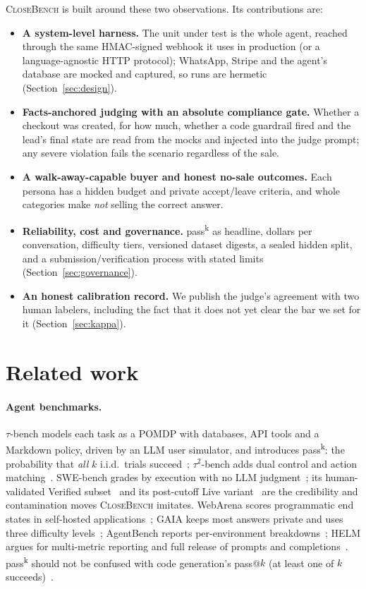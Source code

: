 \documentclass[11pt]{article}
\newcommand{\cb}{\textsc{CloseBench}}
\newcommand{\passk}[1]{pass\textsuperscript{#1}}
\begin{document}
\cb{} is built around these two observations. Its contributions are:
\begin{itemize}
  \item \textbf{A system-level harness.} The unit under test is the whole agent, reached through the
    same HMAC-signed webhook it uses in production (or a language-agnostic HTTP protocol); WhatsApp,
    Stripe and the agent's database are mocked and captured, so runs are hermetic
    (Section~\ref{sec:design}).
  \item \textbf{Facts-anchored judging with an absolute compliance gate.} Whether a checkout was
    created, for how much, whether a code guardrail fired and the lead's final state are read from the
    mocks and injected into the judge prompt; any severe violation fails the scenario regardless of the
    sale.
  \item \textbf{A walk-away-capable buyer and honest no-sale outcomes.} Each persona has a hidden
    budget and private accept/leave criteria, and whole categories make \emph{not} selling the correct
    answer.
  \item \textbf{Reliability, cost and governance.} \passk{k} as headline, dollars per conversation,
    difficulty tiers, versioned dataset digests, a sealed hidden split, and a submission/verification
    process with stated limits (Section~\ref{sec:governance}).
  \item \textbf{An honest calibration record.} We publish the judge's agreement with two human
    labelers, including the fact that it does not yet clear the bar we set for it
    (Section~\ref{sec:kappa}).
\end{itemize}

\section{Related work}
\label{sec:related}

\paragraph{Agent benchmarks.} $\tau$-bench models each task as a POMDP with databases, API tools and a
Markdown policy, driven by an LLM user simulator, and introduces \passk{k}: the probability that
\emph{all} $k$ i.i.d.\ trials succeed~\citep{yao2024taubench}; $\tau^2$-bench adds dual control and
action matching~\citep{barres2025tau2}. SWE-bench grades by execution with no LLM
judgment~\citep{jimenez2024swebench}; its human-validated Verified subset~\citep{openai2024swebenchverified}
and its post-cutoff Live variant~\citep{zhang2025swebenchlive} are the credibility and contamination
moves \cb{} imitates. WebArena scores programmatic end states in self-hosted
applications~\citep{zhou2024webarena}; GAIA keeps most answers private and uses three difficulty
levels~\citep{mialon2024gaia}; AgentBench reports per-environment
breakdowns~\citep{liu2024agentbench}; HELM argues for multi-metric reporting and full release of
prompts and completions~\citep{liang2023helm}. \passk{k} should not be confused with code generation's
pass@$k$ (at least one of $k$ succeeds)~\citep{chen2021codex}.
\end{document}
